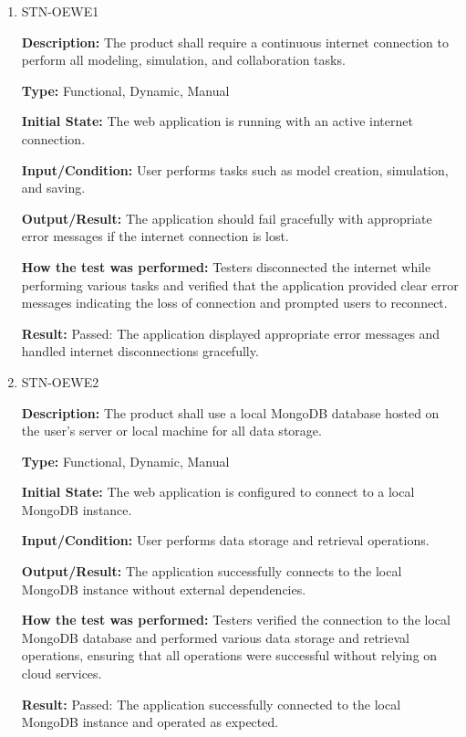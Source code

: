 \documentclass[12pt, titlepage]{article}
\begin{document}
\begin{enumerate}

\item{STN-OEWE1}

\textbf{Description:} The product shall require a continuous internet connection to perform all modeling, simulation, and collaboration tasks.

\textbf{Type:} Functional, Dynamic, Manual

\textbf{Initial State:} The web application is running with an active internet connection.

\textbf{Input/Condition:} User performs tasks such as model creation, simulation, and saving.

\textbf{Output/Result:} The application should fail gracefully with appropriate error messages if the internet connection is lost.

\textbf{How the test was performed:} Testers disconnected the internet while performing various tasks and verified that the application provided clear error messages indicating the loss of connection and prompted users to reconnect.

\textbf{Result:} Passed: The application displayed appropriate error messages and handled internet disconnections gracefully.

\item{STN-OEWE2}

\textbf{Description:} The product shall use a local MongoDB database hosted on the user’s server or local machine for all data storage.

\textbf{Type:} Functional, Dynamic, Manual

\textbf{Initial State:} The web application is configured to connect to a local MongoDB instance.

\textbf{Input/Condition:} User performs data storage and retrieval operations.

\textbf{Output/Result:} The application successfully connects to the local MongoDB instance without external dependencies.

\textbf{How the test was performed:} Testers verified the connection to the local MongoDB database and performed various data storage and retrieval operations, ensuring that all operations were successful without relying on cloud services.

\textbf{Result:} Passed: The application successfully connected to the local MongoDB instance and operated as expected.

\end{enumerate}
\end{document}
